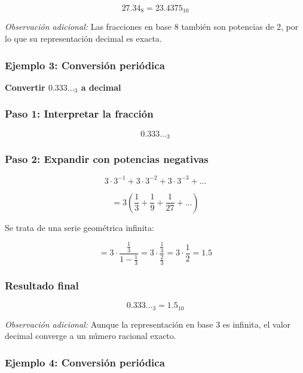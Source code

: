 \documentclass[12pt,twoside]{book}
\begin{document}
						\[
						27.34_8 = 23.4375_{10}
						\]
						
						\noindent
						\emph{Observación adicional:} Las fracciones en base 8 también son potencias de 2, por lo que su representación decimal es exacta.
						
						\subsubsection*{Ejemplo 3: Conversión periódica}
						
						\noindent
						\textbf{Convertir $0.333\ldots_3$ a decimal}
						
						\subsubsection*{Paso 1: Interpretar la fracción}
						
						\[
						0.333\ldots_3
						\]
						
						\subsubsection*{Paso 2: Expandir con potencias negativas}
						
						\[
						3\cdot3^{-1} + 3\cdot3^{-2} + 3\cdot3^{-3} + \ldots
						\]
						
						\[
						= 3\left(\frac{1}{3} + \frac{1}{9} + \frac{1}{27} + \ldots\right)
						\]
						
						\noindent
						Se trata de una serie geométrica infinita:
						
						\[
						= 3 \cdot \frac{\frac{1}{3}}{1 - \frac{1}{3}} = 3 \cdot \frac{\frac{1}{3}}{\frac{2}{3}} = 3 \cdot \frac{1}{2} = 1.5
						\]
						
						\subsubsection*{Resultado final}
						
						\[
						0.333\ldots_3 = 1.5_{10}
						\]
						
						\noindent
						\emph{Observación adicional:} Aunque la representación en base 3 es infinita, el valor decimal converge a un número racional exacto.
						
						\subsubsection*{Ejemplo 4: Conversión periódica}
						
\end{document}
